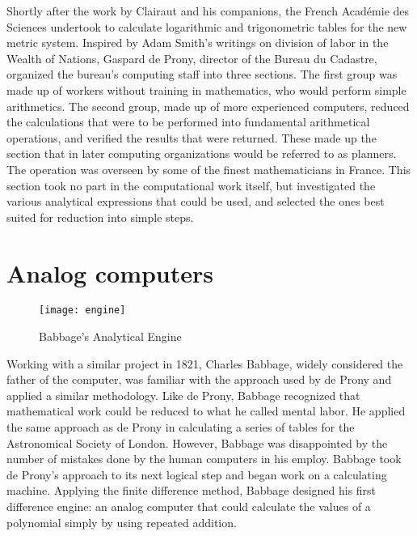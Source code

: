 Shortly after the work by Clairaut and his companions, the French Académie des Sciences undertook to calculate logarithmic and trigonometric tables for the new metric system. Inspired by Adam Smith's
writings on division of labor in the Wealth of Nations, Gaspard de Prony, director of the Bureau du Cadastre, organized the bureau's computing staff into three sections. The first group was made up of
workers without training in mathematics, who would perform simple arithmetics. The second group, made up of more experienced computers, reduced the calculations that were to be performed into
fundamental arithmetical operations, and verified the results that were returned. These made up the section that in later computing organizations would be referred to as planners. The operation was
overseen by some of the finest mathematicians in France. This section took no part in the computational work itself, but investigated the various analytical expressions that could be used, and
selected the ones best suited for reduction into simple steps\cite{hyman1985}.


\section{Analog computers}

\begin{figure}[ht]
    \centering
    \texttt{[image: engine]}
    \caption{Babbage's Analytical Engine\cite{diffengine}}
    \label{fig:engine}
\end{figure}

Working with a similar project in 1821, Charles Babbage, widely considered the father of the computer, was familiar with the approach used by de Prony and applied a similar methodology. Like de Prony,
Babbage recognized that mathematical work could be reduced to what he called mental labor\cite{babbage1832}. He applied the same approach as de Prony in calculating a series of tables for the
Astronomical Society of London. However, Babbage was disappointed by the number of mistakes done by the human computers in his employ. Babbage took de Prony's approach to its next logical step and
began work on a calculating machine. Applying the finite difference method, Babbage designed his first difference engine: an analog computer that could calculate the values of a polynomial simply by
using repeated addition.


